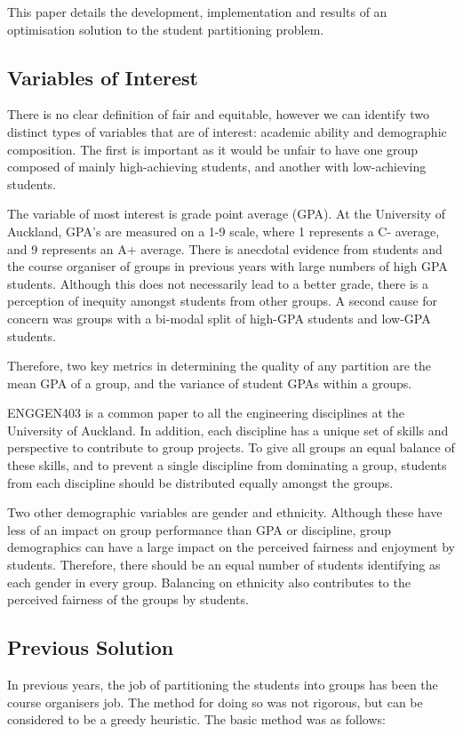 \documentclass[12pt]{ORSNZ}
\begin{document}
This paper details the development, implementation and results of an optimisation solution to the student partitioning problem. 

\subsection{Variables of Interest}
There is no clear definition of fair and equitable, however we can identify two distinct types of variables that are of interest: academic ability and demographic composition. The first is important as it would be unfair to have one group composed of mainly high-achieving students, and another with low-achieving students. 

The variable of most interest is grade point average (GPA). At the University of Auckland, GPA's are measured on a 1-9 scale, where 1 represents a C- average, and 9 represents an A+ average. There is anecdotal evidence from students and the course organiser of groups in previous years with large numbers of high GPA students. Although this does not necessarily lead to a better grade, there is a perception of inequity amongst students from other groups. A second cause for concern was groups with a bi-modal split of high-GPA students and low-GPA students. 

Therefore, two key metrics in determining the quality of any partition are the mean GPA of a group, and the variance of student GPAs within a groups.

ENGGEN403 is a common paper to all the engineering disciplines at the University of Auckland. In addition, each discipline has a unique set of skills and perspective to contribute to group projects. To give all groups an equal balance of these skills, and to prevent a single discipline from dominating a group, students from each discipline should be distributed equally amongst the groups.

Two other demographic variables are gender and ethnicity. Although these have less of an impact on group performance than GPA or discipline, group demographics can have a large impact on the perceived fairness and enjoyment by students. Therefore, there should be an equal number of students identifying as each gender in every group. Balancing on ethnicity also contributes to the perceived fairness of the groups by students.

\subsection{Previous Solution}
In previous years, the job of partitioning the students into groups has been the course organisers job. The method for doing so was not rigorous, but can be considered to be a greedy heuristic. The basic method was as follows:
\end{document}
